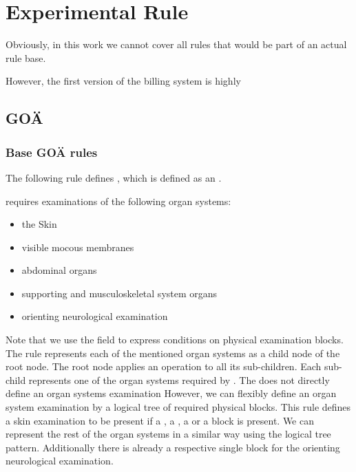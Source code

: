 \section{Experimental Rule}\label{sec:experimental-rule-base}

Obviously, in this work we cannot cover all rules that would be part of an actual rule base.

However, the first version of the billing system is highly

\subsection{GOÄ}
\subsubsection{Base GOÄ rules}

The following rule defines , which is defined as an .



 requires examinations of the following organ systems:
\begin{itemize}
    \item the Skin
    \item visible mocous membranes
    \item abdominal organs
    \item supporting and musculoskeletal system organs
    \item orienting neurological examination
\end{itemize}

Note that we use the \physicalBlocks field to express conditions on physical examination blocks.
The rule represents each of the mentioned organ systems as a child node of the root node.
The root node applies an  operation to all its sub-children.
Each sub-child represents one of the organ systems required by .
The \AVS does not directly define an organ systems examination
However, we can flexibly define an organ system examination by a logical tree of required physical blocks.
This rule defines a skin examination to be present if a , a , a  or a  block is present.
We can represent the rest of the organ systems in a similar way using the logical tree pattern.
Additionally there is already a respective single block for the orienting neurological examination.

